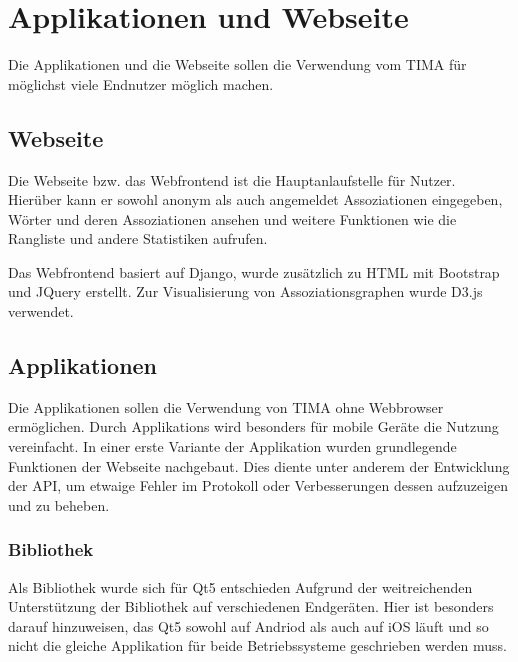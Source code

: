 \chapter{Applikationen und Webseite}
Die Applikationen und die Webseite sollen die Verwendung vom TIMA für möglichst
viele Endnutzer möglich machen.

\section{Webseite}
Die Webseite bzw. das Webfrontend ist die Hauptanlaufstelle für Nutzer. Hierüber kann er sowohl anonym als auch angemeldet Assoziationen eingegeben, Wörter und
deren Assoziationen ansehen und weitere Funktionen wie die Rangliste und andere Statistiken aufrufen.

Das Webfrontend basiert auf Django, wurde zusätzlich zu HTML mit Bootstrap und JQuery erstellt. Zur Visualisierung von Assoziationsgraphen wurde D3.js verwendet.

\section{Applikationen}
Die Applikationen sollen die Verwendung von TIMA ohne Webbrowser ermöglichen. Durch Applikations wird besonders für mobile Geräte die Nutzung vereinfacht.
In einer erste Variante der Applikation wurden grundlegende Funktionen der
Webseite nachgebaut. Dies diente unter anderem der Entwicklung der API, um etwaige
Fehler im Protokoll oder Verbesserungen dessen aufzuzeigen und zu beheben.

\subsection{Bibliothek}
Als Bibliothek wurde sich für Qt5 entschieden Aufgrund der weitreichenden
Unterstützung der Bibliothek auf verschiedenen Endgeräten. Hier ist besonders darauf hinzuweisen, das Qt5 sowohl auf Andriod als auch auf iOS läuft und so nicht die gleiche Applikation für beide Betriebssysteme geschrieben werden muss.

